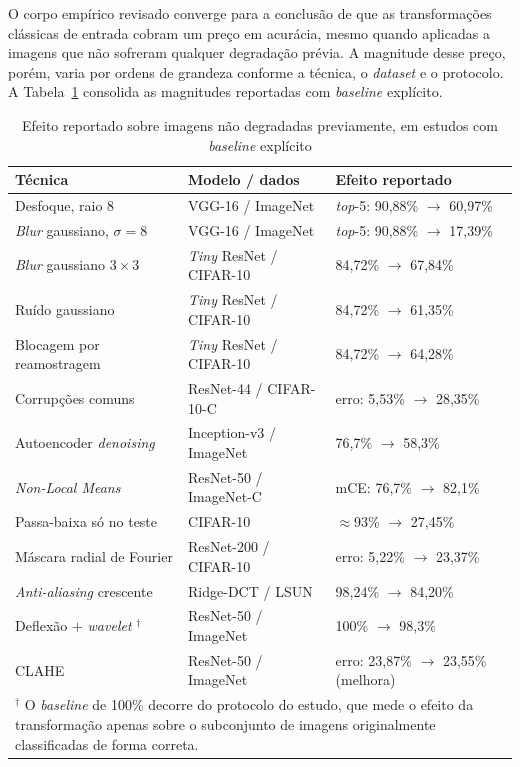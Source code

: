\documentclass[conference]{IEEEtran}
\begin{document}
O corpo empírico revisado converge para a conclusão de que as transformações
clássicas de entrada cobram um preço em acurácia, mesmo quando aplicadas a
imagens que não sofreram qualquer degradação prévia. A magnitude desse preço,
porém, varia por ordens de grandeza conforme a técnica, o \textit{dataset} e o
protocolo. A Tabela~\ref{tab:magnitudes} consolida as magnitudes
reportadas com \textit{baseline} explícito.

\begin{table}[htbp]
\caption{Efeito reportado sobre imagens não degradadas previamente, em estudos com \textit{baseline} explícito}
\begin{center}
\footnotesize
\begin{tabular}{|p{2.0cm}|p{2.0cm}|p{2.6cm}|}
\hline
\textbf{Técnica} & \textbf{Modelo / dados} & \textbf{Efeito reportado} \\
\hline
Desfoque, raio 8 \cite{b4} & VGG-16 / ImageNet & \textit{top}-5: 90,88\%
$\rightarrow$ 60,97\% \\
\hline
\textit{Blur} gaussiano, $\sigma=8$ \cite{b4} & VGG-16 / ImageNet & \textit{top}-5:
90,88\% $\rightarrow$ 17,39\% \\
\hline
\textit{Blur} gaussiano $3\times3$ \cite{b28} & \textit{Tiny} ResNet / CIFAR-10 &
84,72\% $\rightarrow$ 67,84\% \\
\hline
Ruído gaussiano \cite{b28} & \textit{Tiny} ResNet / CIFAR-10 & 84,72\%
$\rightarrow$ 61,35\% \\
\hline
Blocagem por reamostragem \cite{b28} & \textit{Tiny} ResNet / CIFAR-10 &
84,72\% $\rightarrow$ 64,28\% \\
\hline
Corrupções comuns \cite{b29} & ResNet-44 / CIFAR-10-C & erro: 5,53\%
$\rightarrow$ 28,35\% \\
\hline
Autoencoder \textit{denoising} \cite{b7} & Inception-v3 / ImageNet & 76,7\%
$\rightarrow$ 58,3\% \\
\hline
\textit{Non-Local Means} \cite{b6} & ResNet-50 / ImageNet-C & mCE: 76,7\%
$\rightarrow$ 82,1\% \\
\hline
Passa-baixa só no teste \cite{b23} & CIFAR-10 & $\approx$93\% $\rightarrow$
27,45\% \\
\hline
Máscara radial de Fourier \cite{b14} & ResNet-200 / CIFAR-10 & erro: 5,22\%
$\rightarrow$ 23,37\% \\
\hline
\textit{Anti-aliasing} crescente \cite{b21} & Ridge-DCT / LSUN & 98,24\%
$\rightarrow$ 84,20\% \\
\hline
Deflexão $+$ \textit{wavelet} \cite{b11}$^{\dagger}$ & ResNet-50 / ImageNet &
100\% $\rightarrow$ 98,3\% \\
\hline
CLAHE \cite{b6} & ResNet-50 / ImageNet & erro: 23,87\% $\rightarrow$ 23,55\%
(melhora) \\
\hline
\multicolumn{3}{|p{6.9cm}|}{\footnotesize $^{\dagger}$ O \textit{baseline} de
100\% decorre do protocolo do estudo, que mede o efeito da transformação apenas
sobre o subconjunto de imagens originalmente classificadas de forma correta.} \\
\hline
\end{tabular}
\label{tab:magnitudes}
\end{center}
\end{table}
\end{document}
